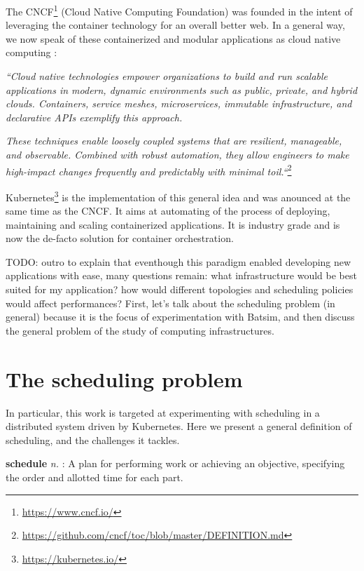 \documentclass[12pt, a4paper]{memoir}
\begin{document}
The CNCF\footnote{\url{https://www.cncf.io/}} (Cloud Native Computing
Foundation) was founded in the intent of leveraging the container technology
for an overall better web. In a general way, we now speak of these
containerized and modular applications as cloud native computing :

\textit{``Cloud native technologies empower organizations to build and run
	scalable applications in modern, dynamic environments such as public,
	private, and hybrid clouds. Containers, service meshes, microservices,
	immutable infrastructure, and declarative APIs exemplify this
	approach.}

\textit{These techniques enable loosely coupled systems that
	are resilient, manageable, and observable.  Combined with robust
	automation, they allow engineers to make high-impact changes frequently
	and predictably with minimal toil.``}\footnote{\url{https://github.com/cncf/toc/blob/master/DEFINITION.md}}

Kubernetes\footnote{\url{https://kubernetes.io/}} is the implementation of this
general idea and was anounced at the same time as the CNCF. It aims at
automating of the process of deploying, maintaining and scaling containerized
applications. It is industry grade and is now the de-facto solution for
container orchestration.

TODO: outro to explain that eventhough this paradigm enabled developing new
applications with ease, many questions remain: what infrastructure would be
best suited for my application? how would different topologies and scheduling
policies would affect performances?  First, let's talk about the scheduling
problem (in general) because it is the focus of experimentation with Batsim,
and then discuss the general problem of the study of computing infrastructures.

\section{The scheduling problem}

In particular, this work is targeted at experimenting with scheduling in a
distributed system driven by Kubernetes. Here we present a general definition
of scheduling, and the challenges it tackles.

\begin{displayquote}[][]
	\textbf{schedule} \textit{n.} : A plan for
	performing work or achieving an objective, specifying the order and
	allotted time for each part.
\end{displayquote}
\end{document}
